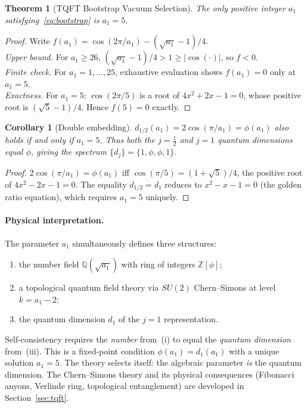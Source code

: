 \documentclass[12pt,a4paper]{article}
\newtheorem{theorem}{Theorem}
\newtheorem{corollary}{Corollary}
\theoremstyle{definition}
\begin{document}
\begin{theorem}[TQFT Bootstrap Vacuum Selection]
\label{thm:bootstrap}
The only positive integer $a_1$ satisfying~\eqref{eq:bootstrap} is $a_1 = 5$.
\end{theorem}

\begin{proof}
Write $f(a_1) = \cos(2\pi/a_1) - (\sqrt{a_1} - 1)/4$.\\
\emph{Upper bound.}  For $a_1 \ge 26$, $(\sqrt{a_1} - 1)/4 > 1 \ge |\cos(\cdot)|$, so $f < 0$.\\
\emph{Finite check.}  For $a_1 = 1, \dots, 25$, exhaustive evaluation shows $f(a_1) = 0$ only at $a_1 = 5$.\\
\emph{Exactness.}  For $a_1 = 5$: $\cos(2\pi/5)$ is a root of $4x^2 + 2x - 1 = 0$, whose positive root is $(\sqrt{5} - 1)/4$.  Hence $f(5) = 0$ exactly.
\end{proof}

\begin{corollary}[Double embedding]
\label{cor:double}
$d_{1/2}(a_1) = 2\cos(\pi/a_1) = \phi(a_1)$ also holds if and only if $a_1 = 5$.  Thus both the $j = \tfrac12$ and $j = 1$ quantum dimensions equal $\phi$, giving the spectrum $\{d_j\} = \{1, \phi, \phi, 1\}$.
\end{corollary}

\begin{proof}
$2\cos(\pi/a_1) = \phi(a_1)$ iff $\cos(\pi/5) = (1+\sqrt{5})/4$, the positive root of $4x^2 - 2x - 1 = 0$.  The equality $d_{1/2} = d_1$ reduces to $x^2 - x - 1 = 0$ (the golden ratio equation), which requires $a_1 = 5$ uniquely.
\end{proof}

\paragraph{Physical interpretation.}
The parameter $a_1$ simultaneously defines three structures:
\begin{enumerate}
\item[(i)] the number field $\mathbb{Q}(\sqrt{a_1})$ with ring of integers $\mathbb{Z}[\phi]$;
\item[(ii)] a topological quantum field theory via $SU(2)$ Chern--Simons at level $k = a_1 - 2$;
\item[(iii)] the quantum dimension $d_1$ of the $j = 1$ representation.
\end{enumerate}
Self-consistency requires the \emph{number} from~(i) to equal the \emph{quantum dimension} from~(iii).  This is a fixed-point condition $\phi(a_1) = d_1(a_1)$ with a unique solution $a_1 = 5$.  The theory selects itself: the algebraic parameter \emph{is} the quantum dimension.  The Chern--Simons theory and its physical consequences (Fibonacci anyons, Verlinde ring, topological entanglement) are developed in Section~\ref{sec:tqft}.
\end{document}
